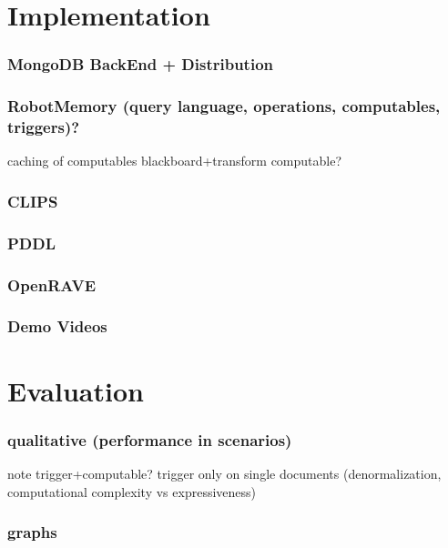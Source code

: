 \section{Implementation}
\begin{frame}
  \frametitle{MongoDB BackEnd + Distribution}
\end{frame}
\begin{frame}
  \frametitle{RobotMemory (query language, operations, computables, triggers)?}

caching of computables
blackboard+transform computable?
\end{frame}
\begin{frame}
  \frametitle{CLIPS}
\end{frame}
\begin{frame}
  \frametitle{PDDL}
\end{frame}
\begin{frame}
  \frametitle{OpenRAVE}
\end{frame}
\begin{frame}
  \frametitle{Demo Videos}
\end{frame}
\section{Evaluation}
\begin{frame}
  \frametitle{qualitative (performance in scenarios)}

note trigger+computable?
trigger only on single documents (denormalization, computational complexity vs expressiveness)
\end{frame}
\begin{frame}
  \frametitle{graphs}
\end{frame}
